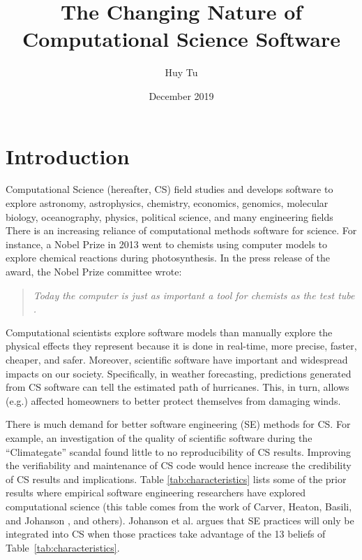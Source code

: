 \documentclass[sigconf]{acmart}
\title[Changing  Nature of CS Software]{The Changing Nature of Computational Science Software}
\author{Huy Tu}
\affiliation{Computer Science, NC State, USA} \email{hqtu@ncsu.edu}
\date{December 2019}
\begin{document}
\maketitle

\section{Introduction}
  

Computational Science (hereafter, CS)
field studies and develops software   to explore
 astronomy, astrophysics, chemistry, economics, genomics, molecular biology, oceanography, physics, political science,  and many   engineering fields 
There is an increasing reliance of computational methods software for science. For instance, a Nobel Prize in 2013 went to chemists using computer models to explore chemical reactions during photosynthesis. In the press release of the award, the Nobel Prize committee wrote:

\begin{quote}
{\em Today the computer is just as important a tool for chemists as the test tube \cite{nobel_2013}.}
\end{quote}


Computational scientists explore software models than manually explore the physical effects they represent because it is done in real-time, more precise, faster, cheaper, and safer.   Moreover, scientific software have important and widespread impacts on our society. Specifically, in weather forecasting, predictions generated from CS
software can tell the estimated path of hurricanes. This, in turn,
allows (e.g.) affected homeowners to better protect themselves from
damaging winds. 


There is much demand for better software engineering (SE) methods
for CS. For example, an investigation of the 
quality of scientific software during the ``Climategate'' scandal \cite{merali10_error} found little to no reproducibility of CS results. Improving the verifiability and maintenance of CS code would hence increase the credibility of CS results and implications. Table \ref{tab:characteristics}
lists some of the prior results
where empirical software
engineering researchers have explored computational science
(this table comes from the work of
Carver, Heaton, Basili, and Johanson \cite{carver13_perception, carver07_environment, basili08_hpc, heaton15_lit, johan18_secs}, and others).
Johanson et al. \cite{johan18_secs}   argues that SE practices will only be integrated into CS when
those practices take advantage of
the   13 beliefs  of
Table~\ref{tab:characteristics}. 
 
\end{document}
